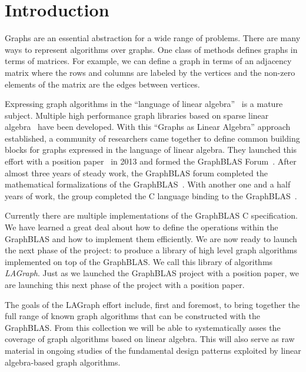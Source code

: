 \section{Introduction}
\label{sec:intro}



Graphs are an essential abstraction for a wide range of problems.  There are 
many ways to represent algorithms over graphs.  One class of methods defines
graphs in terms of matrices.  For example, we can define a graph in terms of an 
adjacency matrix where the rows and columns are labeled by the vertices and the
non-zero elements of the matrix are the edges between vertices.  

Expressing graph algorithms in the ``language of linear
algebra''~\cite{kepner2011graph} is a mature subject.  Multiple 
high performance graph libraries based on sparse 
linear algebra~\cite{combblas,
gadepally2015graphulo, gpi2016, sundaram2015graphmat,che2016programming}
have been developed.   With this ``Graphs as Linear Algebra'' approach established, 
a community of researchers came together to define common building
blocks for graphs expressed in the language of linear algebra.  They launched
this effort with a position paper~\cite{hpec13} in 2013 and formed the GraphBLAS
Forum~\cite{graphblas_web}.  After almost three years of steady work,
the GraphBLAS forum completed the
mathematical formalizations of the GraphBLAS~\cite{mathgraphblas16}. With another 
one and a half years of work, the group completed the C
language binding to the GraphBLAS~\cite{cspec}.

Currently there are multiple implementations of the GraphBLAS C specification.  
We have learned a great deal about how to define the operations within the GraphBLAS 
and how to implement them efficiently.  We are now ready to launch the next phase of the project:
to produce a library of high level graph algorithms implemented on top of the GraphBLAS.
We call this library of algorithms \emph{LAGraph}.
Just as we launched the GraphBLAS project with a position paper, we are launching 
this next phase of the project with a position paper.  

The goals of the LAGraph effort include, first and foremost, to bring together the full 
range of known graph algorithms that can be constructed with the GraphBLAS.
From this collection we will be able to systematically asses the coverage of 
graph algorithms based on linear algebra. This will also serve
as raw material in ongoing studies of the fundamental design patterns exploited 
by linear algebra-based graph algorithms. 

